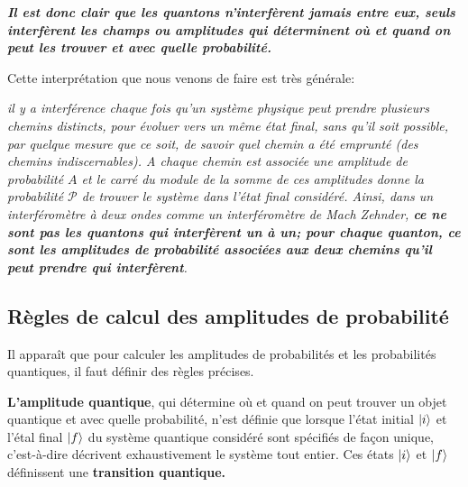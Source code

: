 \emph{\textbf{Il est donc clair que les quantons n'interfèrent jamais entre eux,
seuls interfèrent les champs ou amplitudes qui déterminent où et quand on peut
les trouver et avec quelle probabilité.}}

Cette interprétation que nous venons de faire est très générale:

\medskip
\colorbox[gray]{0.8}{
\parbox[c]{0.9\textwidth}{
\emph{il y a interférence chaque fois qu'un système physique peut prendre
plusieurs chemins distincts, pour évoluer vers un même état final, sans qu'il
soit possible, par quelque mesure que ce soit, de savoir quel chemin a été
emprunté (des chemins indiscernables). A chaque chemin est associée une
amplitude de probabilité $A$ et le carré du module de la somme de ces amplitudes
donne la probabilité $\mathcal{P}$ de trouver le système dans l'état final
considéré. Ainsi, dans un interféromètre à deux ondes comme un interféromètre de
Mach Zehnder, \textbf{ce ne sont pas les quantons qui interfèrent un à un; pour
chaque quanton, ce sont les amplitudes de probabilité associées aux deux chemins
qu'il peut prendre qui interfèrent}.}
}}

\subsection{Règles de calcul des amplitudes de probabilité}

Il apparaît que pour calculer les amplitudes de probabilités et les
probabilités quantiques, il faut définir des règles précises.

\colorbox[gray]{0.8}{
\parbox[c]{0.9\textwidth}{
\begin{definition}
\textbf{L'amplitude quantique}, qui détermine où et quand on peut trouver un
objet quantique et avec quelle probabilité, n'est définie que lorsque l'état
initial $\vert i\rangle$ et l'étal final $\vert f\rangle$ du système quantique considéré sont
spécifiés de façon unique, c'est-à-dire décrivent exhaustivement le système tout
entier. Ces états $\vert i\rangle$ et $\vert f\rangle$ définissent une \textbf{transition
quantique.}
\end{definition}
}}

